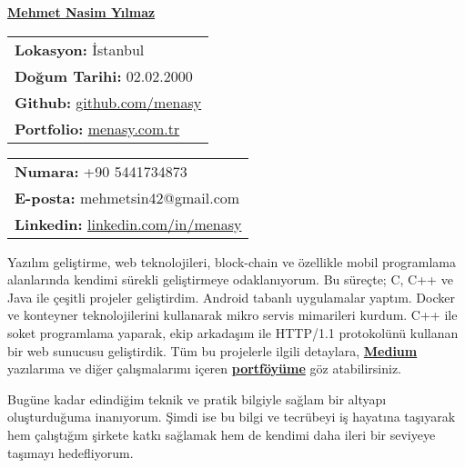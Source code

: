 \documentclass[a4paper,11pt]{article}
\begin{document}
\vspace*{-6.5em} 
\begin{center}
    \href{https://menasy.com.tr/}{\LARGE \textbf{Mehmet Nasim Yılmaz}}
\end{center}
\vspace*{0.5em} 
\noindent
\begin{minipage}[t]{0.48\textwidth}
    \begin{tabular}{@{}l}
        \textbf{Lokasyon:} İstanbul \\
        \textbf{Doğum Tarihi:} 02.02.2000 \\
        \textbf{Github:} \href{https://github.com/menasy}{github.com/menasy} \\
        \textbf{Portfolio:} \href{https://menasy.com.tr/}{menasy.com.tr} \\
    \end{tabular}
\end{minipage}%
\hfill
\begin{minipage}[t]{0.48\textwidth}
    \raggedleft
    \begin{tabular}{@{}l}
        \textbf{Numara:} +90 5441734873 \\
        \textbf{E-posta:} mehmetsin42@gmail.com \\
        \textbf{Linkedin:} \href{https://linkedin.com/in/menasy}{linkedin.com/in/menasy} \\
    \end{tabular}
\end{minipage}

\vspace{0.7em}

Yazılım geliştirme, web teknolojileri, block-chain ve özellikle mobil programlama alanlarında kendimi sürekli geliştirmeye odaklanıyorum. Bu süreçte; C, C++ ve Java ile çeşitli projeler geliştirdim. Android tabanlı uygulamalar yaptım. Docker ve konteyner teknolojilerini kullanarak mikro servis mimarileri kurdum. C++ ile soket programlama yaparak, ekip arkadaşım ile HTTP/1.1 protokolünü kullanan bir web sunucusu geliştirdik. Tüm bu projelerle ilgili detaylara, \textbf{\href{https://medium.com/@menasy}{Medium}} yazılarıma ve diğer çalışmalarımı içeren \textbf{\href{https://menasy.com.tr/}{portföyüme}} göz atabilirsiniz.
\vspace{-0.5em}

Bugüne kadar edindiğim teknik ve pratik bilgiyle sağlam bir altyapı oluşturduğuma inanıyorum. Şimdi ise bu bilgi ve tecrübeyi iş hayatına taşıyarak hem çalıştığım şirkete katkı sağlamak hem de kendimi daha ileri bir seviyeye taşımayı hedefliyorum.
\vspace{-0.5em}
\end{document}
